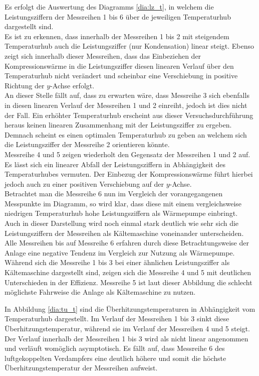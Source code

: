 Es erfolgt die Auswertung des Diagramms \ref{dia:lz_t}, in welchem die Leistungsziffern der Messreihen 1 bis 6 über de jeweiligen Temperaturhub dargestellt sind.\\
Es ist zu erkennen, dass innerhalb der Messreihen 1 bis 2 mit steigendem Temperaturhub auch die Leistungsziffer (nur Kondensation) linear steigt. Ebenso zeigt sich innerhalb dieser Messreihen, dass das Einbeziehen  der Kompressionswärme in die Leistungsziffer diesen linearen Verlauf über den Temperaturhub nicht verändert und scheinbar eine Verschiebung in positive Richtung der $y$-Achse erfolgt. \\
An dieser Stelle fällt auf, dass zu erwarten wäre, dass Messreihe 3 sich ebenfalls in diesen linearen Verlauf der Messreihen 1 und 2 einreiht, jedoch ist dies nicht der Fall. Ein erhöhter Temperaturhub erscheint aus dieser Versuchsdurchführung heraus keinen linearen Zusammenhang mit der Leistungsziffer zu ergeben. Demnach scheint es einen optimalen Temperaturhub zu geben an welchem sich die Leistungsziffer der Messreihe 2 orientieren könnte.  \\
Messreihe 4 und 5 zeigen wiederholt den Gegensatz der Messreihen 1 und 2 auf. Es lässt sich ein linearer Abfall der Leistungsziffern in Abhängigkeit des Temperaturhubes vermuten. Der Einbezug der Kompressionswärme führt hierbei jedoch auch zu einer positiven Verschiebung auf der $y$-Achse.\\
Betrachtet man die Messreihe 6 nun im Vergleich der vorangegangenen Messpunkte im Diagramm, so wird klar, dass diese mit einem vergleichsweise niedrigen Temperaturhub hohe Leistungsziffern als Wärmepumpe einbringt.\\
Auch in dieser Darstellung wird noch einmal stark deutlich wie sehr sich die Leistungsziffern der Messreihen als Kältemaschine voneinander unterscheiden. Alle Messreihen bis auf Messreihe 6 erfahren durch diese Betrachtungsweise der Anlage eine negative Tendenz im Vergleich zur Nutzung als Wärmepumpe. Während sich die Messreihe 1 bis 3 bei einer ähnlichen Leistungsziffer als Kältemaschine dargestellt sind, zeigen sich die Messreihe 4 und 5 mit deutlichen Unterschieden in der Effizienz. Messreihe 5 ist laut dieser Abbildung die schlecht möglichste Fahrweise die Anlage als Kältemaschine zu nutzen.

In Abbildung \ref{dia:tu_t} sind die Überhitzungstemperaturen in Abhängigkeit vom Temperaturhub dargestellt. Im Verlauf der Messreihen 1 bis 3 sinkt diese Überhitzungstemperatur, während sie im Verlauf der Messreihen 4 und 5 steigt. Der Verlauf innerhalb der Messreihen 1 bis 3 wird als nicht linear angenommen und verläuft womöglich asymptotisch. Es fällt auf, dass Messreihe 6 des luftgekoppelten Verdampfers eine deutlich höhere und somit die höchste Überhitzungstemperatur der Messreihen aufweist.\\

